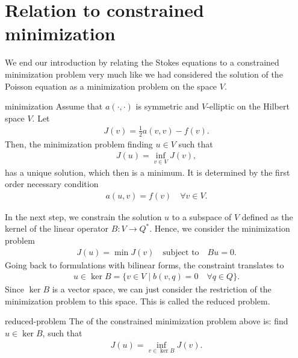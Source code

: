 \section{Relation to constrained minimization}

\begin{intro}
  We end our introduction by relating the Stokes equations to a
  constrained minimization problem very much like we had considered
  the solution of the Poisson equation as a minimization problem on
  the space $V$.
\end{intro}

\begin{Theorem}{minimization}
  Assume that $a(\cdot,\cdot)$ is symmetric and $V$-elliptic on the Hilbert
  space $V$. Let
  \begin{gather}
    J(v) = \tfrac12 a(v,v) - f(v).    
  \end{gather}
  Then, the minimization problem finding $u\in V$ such that
  \begin{align}
    J(u) =\inf_{v\in V} J(v),
  \end{align}
  has a unique solution, which then is a minimum. It is determined by
  the first order necessary condition
  \begin{gather}
    a(u,v) = f(v) \quad\forall v\in V.
  \end{gather}
\end{Theorem}

\begin{intro}
  In the next step, we constrain the solution $u$ to a subspace of $V$
  defined as the kernel of the linear operator $B: V\to Q^*$. Hence,
  we consider the minimization problem
  \begin{gather}
    J(u) =\min J(v) \quad
    \text{subject to}\quad
    Bu = 0.
  \end{gather}
  Going back to formulations with bilinear forms, the constraint
  translates to
  \begin{gather}
    u\in \ker B = \bigl\{ v\in V \;\big|\;
    b(v,q)=0 \quad\forall q\in Q\}.
  \end{gather}
  Since $\ker B$ is a vector space, we can just consider the
  restriction of the minimization problem to this space. This is
  called the reduced problem.
\end{intro}

\begin{Definition}{reduced-problem}
  The  of the constrained minimization problem
  above is: find $u\in \ker B$, such that
  \begin{gather}
    J(u) =\inf_{v\in \ker B} J(v).
  \end{gather}
\end{Definition}


